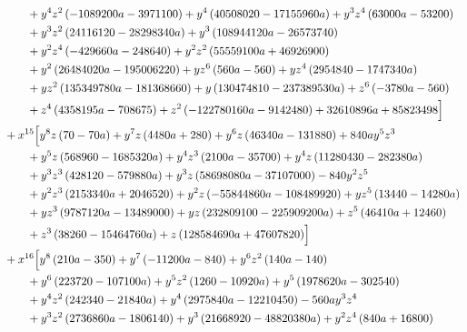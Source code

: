 \begin{align*}
&\qquad + y^{4} z^{2} \left(- 1089200 a - 3971100\right) + y^{4} \left(40508020 - 17155960 a\right) + y^{3} z^{4} \left(63000 a - 53200\right)\\
&\qquad + y^{3} z^{2} \left(24116120 - 28298340 a\right) + y^{3} \left(108944120 a - 26573740\right)\\
&\qquad + y^{2} z^{4} \left(- 429660 a - 248640\right) + y^{2} z^{2} \left(55559100 a + 46926900\right)\\
&\qquad + y^{2} \left(26484020 a - 195006220\right) + y z^{6} \left(560 a - 560\right) + y z^{4} \left(2954840 - 1747340 a\right)\\
&\qquad + y z^{2} \left(135349780 a - 181368660\right) + y \left(130474810 - 237389530 a\right) + z^{6} \left(- 3780 a - 560\right)\\
&\qquad + z^{4} \left(4358195 a - 708675\right) + z^{2} \left(- 122780160 a - 9142480\right) + 32610896 a + 85823498\Bigr]\\
&{}+x^{15}\Bigl[y^{8} z \left(70 - 70 a\right) + y^{7} z \left(4480 a + 280\right) + y^{6} z \left(46340 a - 131880\right) + 840 a y^{5} z^{3}\\
&\qquad + y^{5} z \left(568960 - 1685320 a\right) + y^{4} z^{3} \left(2100 a - 35700\right) + y^{4} z \left(11280430 - 282380 a\right)\\
&\qquad + y^{3} z^{3} \left(428120 - 579880 a\right) + y^{3} z \left(58698080 a - 37107000\right) - 840 y^{2} z^{5}\\
&\qquad + y^{2} z^{3} \left(2153340 a + 2046520\right) + y^{2} z \left(- 55844860 a - 108489920\right) + y z^{5} \left(13440 - 14280 a\right)\\
&\qquad + y z^{3} \left(9787120 a - 13489000\right) + y z \left(232809100 - 225909200 a\right) + z^{5} \left(46410 a + 12460\right)\\
&\qquad + z^{3} \left(38260 - 15464760 a\right) + z \left(128584690 a + 47607820\right)\Bigr]\\
&{}+x^{16}\Bigl[y^{8} \left(210 a - 350\right) + y^{7} \left(- 11200 a - 840\right) + y^{6} z^{2} \left(140 a - 140\right)\\
&\qquad + y^{6} \left(223720 - 107100 a\right) + y^{5} z^{2} \left(1260 - 10920 a\right) + y^{5} \left(1978620 a - 302540\right)\\
&\qquad + y^{4} z^{2} \left(242340 - 21840 a\right) + y^{4} \left(2975840 a - 12210450\right) - 560 a y^{3} z^{4}\\
&\qquad + y^{3} z^{2} \left(2736860 a - 1806140\right) + y^{3} \left(21668920 - 48820380 a\right) + y^{2} z^{4} \left(840 a + 16800\right)\\

\end{align*}
